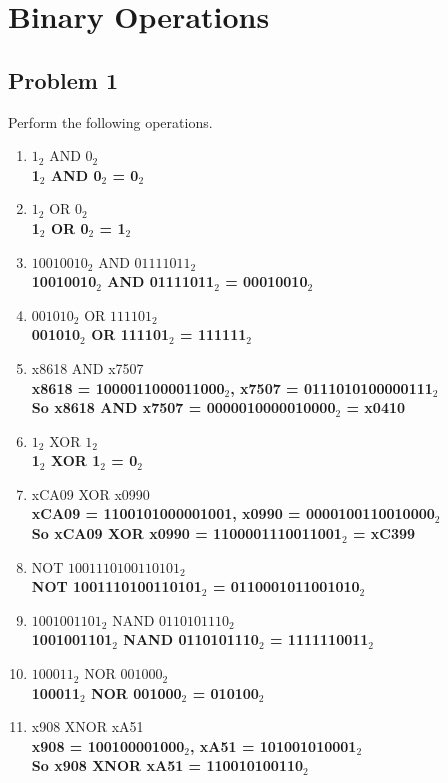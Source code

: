 \documentclass{article}
\begin{document}
\newpage
\section*{Binary Operations} %

\subsection*{Problem 1}
Perform the following operations. 
\begin{enumerate}[label=\alph*.]
    \item $1_2$ AND $0_2$\\
    \textbf{1$_2$ AND 0$_2$ = 0$_2$}
    \item $1_2$ OR $0_2$\\
    \textbf{1$_2$ OR 0$_2$ = 1$_2$}
    \item $10010010_2$ AND $01111011_2$\\
    \textbf{10010010$_2$ AND 01111011$_2$ = 00010010$_2$}
    \item $001010_2$ OR $111101_2$\\
    \textbf{001010$_2$ OR 111101$_2$ = 111111$_2$}
    \item x8618 AND x7507\\
    \textbf{x8618 = 1000011000011000$_2$, x7507 = 0111010100000111$_2$\\
            So x8618 AND x7507 = 0000010000010000$_2$ = x0410}
    \item $1_2$ XOR $1_2$\\
    \textbf{1$_2$ XOR 1$_2$ = 0$_2$}
    \item xCA09 XOR x0990\\
    \textbf{xCA09 = 1100101000001001, x0990 = 0000100110010000$_2$\\
            So xCA09 XOR x0990 = 1100001110011001$_2$ = xC399}
    \item NOT $1001110100110101_2$\\
    \textbf{NOT 1001110100110101$_2$ = 0110001011001010$_2$}
    \item $1001001101_2$ NAND $0110101110_2$\\
    \textbf{1001001101$_2$ NAND 0110101110$_2$ = 1111110011$_2$}
    \item $100011_2$ NOR $001000_2$\\
    \textbf{100011$_2$ NOR 001000$_2$ = 010100$_2$}
    \item x908 XNOR xA51\\
    \textbf{x908 = 100100001000$_2$, xA51 = 101001010001$_2$\\
            So x908 XNOR xA51 = 110010100110$_2$}
\end{enumerate}
\end{document}
